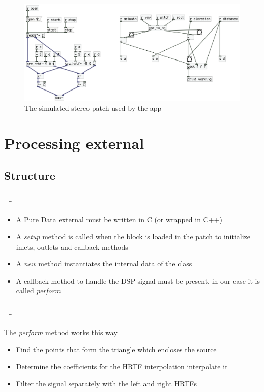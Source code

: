 \documentclass{beamer}
\begin{document}
	\begin{frame}
		\frametitle{\insertsection}
		\begin{figure}
			\centering
			  \includegraphics[width=1.0\textwidth]{images/iOS_patch_stereo.png}
			  \caption{The simulated stereo patch used by the app}
		\end{figure}
	\end{frame}

	\section{Processing external}
	\subsection{Structure}

	\begin{frame}
		\frametitle{\insertsection\ - \insertsubsection}
		\begin{itemize}
			\item A Pure Data external must be written in C (or wrapped in C++)
			\item A {\em setup} method is called when the block is loaded in the patch to initialize inlets,
				outlets and callback methods
			\item A {\em new} method instantiates the internal data of the class
			\item A callback method to handle the DSP signal must be present, in our case it is called {\em perform}
		\end{itemize}
	\end{frame}

	\begin{frame}
		\frametitle{\insertsection\ - \insertsubsection}
		The {\em perform} method works this way
		\begin{itemize}
			\item Find the points that form the triangle which encloses the source
			\item Determine the coefficients for the \textsc{HRTF} interpolation interpolate it
			\item Filter the signal separately with the left and right \textsc{HRTF}s
		\end{itemize}
	\end{frame}
\end{document}
